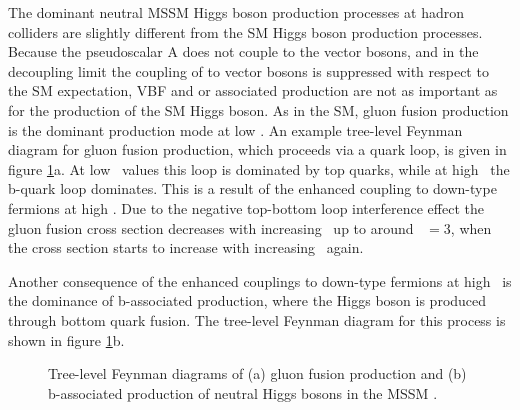 The dominant neutral MSSM Higgs boson production processes at hadron colliders
are slightly different from the \ac{SM} Higgs boson production processes. 
Because the pseudoscalar A does not couple to the
vector bosons, and in the decoupling limit the coupling of \PHiggs to vector
bosons is suppressed with respect to the \ac{SM} expectation, VBF and \PW or \PZ associated
production are not as important as for the production of the \ac{SM} Higgs boson. As in the \ac{SM}, gluon fusion production is 
the dominant production mode at low \tanb.
An example tree-level Feynman diagram for gluon fusion production, which proceeds via
a quark loop, is given in figure \ref{fig:production_mssm}a.
At low \tanb~values this loop is dominated by top quarks, while at 
high \tanb~the b-quark loop dominates. This is a result of the enhanced coupling to down-type fermions at high \tanb. 
Due to the negative top-bottom loop interference effect the gluon fusion cross section decreases with increasing \tanb~up
to around \tanb~$=3$, when the cross section starts to increase with increasing \tanb~again.

Another consequence of the enhanced couplings to down-type fermions at high \tanb~is the dominance of b-associated production, where the Higgs boson is produced through
bottom quark fusion. The tree-level Feynman diagram for this process is shown in figure \ref{fig:production_mssm}b.

\begin{figure}[h!]
\begin{center}
\end{center}
\caption[Tree-level Feynman diagrams of gluon fusion and b-associated production of neutral Higgs bosons in the MSSM]{Tree-level Feynman diagrams of (a) gluon fusion production and (b) b-associated
production of neutral Higgs bosons in the MSSM \cite{CMS-PAS-HIG-16-037}.}
\label{fig:production_mssm}
\end{figure}

